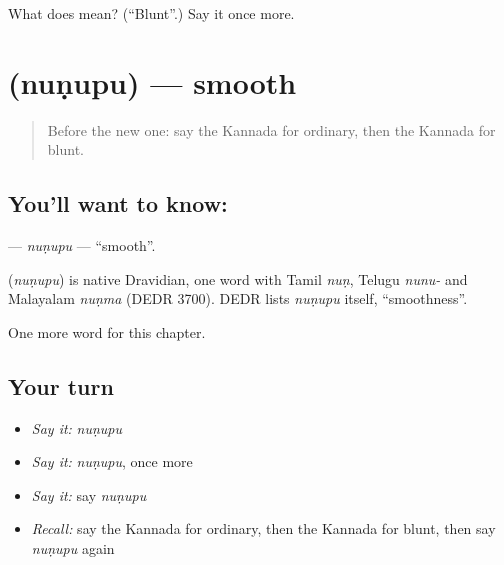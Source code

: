 \begin{tcolorbox}[breakable,colback=teal!4,colframe=teal!35!black,title={Before you move on}]
What does  mean? (\textquotedblleft{}Blunt\textquotedblright{}.) Say it once more.
\end{tcolorbox}
\section[\texorpdfstring{\kn{ನುಣುಪು} (nuṇupu)}{ನುಣುಪು (nuṇupu)}]{ (nuṇupu) — smooth}

\label{lesson:KA-C219-nunupu}



\begin{quote}
Before the new one: say the Kannada for ordinary, then the Kannada for blunt.
\end{quote}

\subsection*{You'll want to know: }
\textbf{} — \emph{nuṇupu} — \textquotedblleft{}smooth\textquotedblright{}.

\begin{cousinweb}
\textbf{} (\emph{nuṇupu}) is native Dravidian, one word with Tamil \emph{nuṇ}, Telugu \emph{nunu-} and Malayalam \emph{nuṇma} (DEDR 3700). DEDR lists \emph{nuṇupu} itself, \textquotedblleft{}smoothness\textquotedblright{}.
\end{cousinweb}

\begin{grammarlens}[title={What you've built}]
One more word for this chapter.
\end{grammarlens}

\subsection*{Your turn}
\begin{itemize}
\raggedright
  \item \emph{Say it:} \emph{nuṇupu}
  \item \emph{Say it:} \emph{nuṇupu}, once more
  \item \emph{Say it:} say \emph{nuṇupu}
  \item \emph{Recall:} say the Kannada for ordinary, then the Kannada for blunt, then say \emph{nuṇupu} again
\end{itemize}

